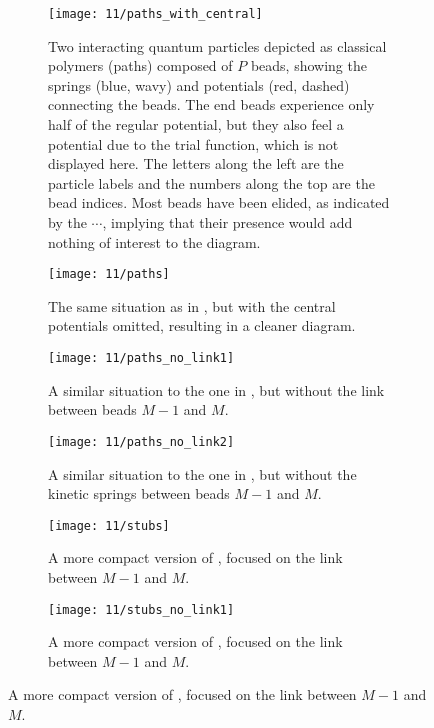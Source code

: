 \begin{figure}
	\setlength{\figspacing}{10 mm}
	\centering
	\begin{subfigure}[b]{\textwidth}
		\texttt{[image: 11/paths\_with\_central]}
		\caption{
			Two interacting quantum particles depicted as classical polymers (paths) composed of $P$ beads, showing the springs (blue, wavy) and potentials (red, dashed) connecting the beads.
			The end beads experience only half of the regular potential, but they also feel a potential due to the trial function, which is not displayed here.
			The letters along the left are the particle labels and the numbers along the top are the bead indices.
			Most beads have been elided, as indicated by the $\cdots$, implying that their presence would add nothing of interest to the diagram.
		}
		\label{fig:paths-with-central}
		\vspace{\figspacing}
	\end{subfigure}
	\begin{subfigure}[b]{\textwidth}
		\texttt{[image: 11/paths]}
		\caption{
			The same situation as in , but with the central potentials omitted, resulting in a cleaner diagram.
		}
		\label{fig:paths}
		\vspace{\figspacing}
	\end{subfigure}
	\begin{subfigure}[b]{\textwidth}
		\texttt{[image: 11/paths\_no\_link1]}
		\caption{
			A similar situation to the one in , but without the link between beads $M-1$ and $M$.
		}
		\label{fig:paths-no-link1}
		\vspace{\figspacing}
	\end{subfigure}
	\begin{subfigure}[b]{\textwidth}
		\texttt{[image: 11/paths\_no\_link2]}
		\caption{
			A similar situation to the one in , but without the kinetic springs between beads $M-1$ and $M$.
		}
		\label{fig:paths-no-link2}
		\vspace{\figspacing}
	\end{subfigure}
	\mbox{}
	\hfill
	\begin{subfigure}[b]{0.45\textwidth}
		\centering
		\texttt{[image: 11/stubs]}
		\caption{
			A more compact version of , focused on the link between $M-1$ and $M$.
		}
		\label{fig:stubs}
	\end{subfigure}
	\hfill
	\begin{subfigure}[b]{0.45\textwidth}
		\centering
		\texttt{[image: 11/stubs\_no\_link1]}
		\caption{
			A more compact version of , focused on the link between $M-1$ and $M$.
		}
		\label{fig:stubs-no-link1}
	\end{subfigure}
	\hfill
	\mbox{}
	\vspace{\figspacing}


\end{figure}
